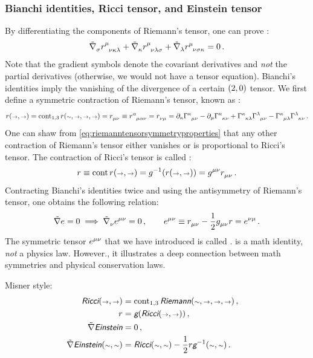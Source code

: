 \subsubsection{Bianchi identities, Ricci tensor, and Einstein tensor}
%
 By differentiating the components of Riemann's tensor, one can prove :
%
\begin{equation}\label{eq:bianchiidentities}
  \tgradcov\sigma\triemann\mu\nu\kappa\lambda 
  + \tgradcov\kappa\triemann\mu\nu\lambda\sigma 
  + \tgradcov\lambda\triemann\mu\nu\sigma\kappa
  = 0\,.
\end{equation}
%
 Note that the gradient symbols denote the covariant derivatives and \emph{not} the partial derivatives (otherwise, we would not have a tensor equation). Bianchi's identities imply the vanishing of the divergence of a certain $\torder 20$ tensor. We first define a symmetric contraction of Riemann's tensor, known as :
%
\begin{equation}\label{eq:riccitensordefinition}
  \ricci\vat{\vslot,\vslot} 
    = \cont_{1,3}\riemann\vat{\cslot,\vslot,\vslot,\vslot}
    = \tricci\mu\nu \defas \triemann\alpha\mu\alpha\nu
    = \tricci\nu\mu
    = \ipd\kappa\tchris\kappa\mu\nu - \ipd\mu\tchris\kappa\kappa\nu 
      + \tchris\kappa\kappa\lambda\tchris\lambda\mu\nu
      - \tchris\kappa\mu\lambda\tchris\lambda\kappa\nu\,.
\end{equation}
%
 One can shaw from \cref{eq:riemanntensorsymmetryproperties} that any other contraction of Riemann's tensor either vanishes or is proportional to Ricci's tensor. The contraction of Ricci's tensor is called :
%
\begin{equation}\label{eq:ricciscalardefinition}
  \sricci \defas \cont\ricci\vat{\vslot,\vslot}
    = \invmet\vat{\ricci\vat{\vslot,\vslot}}
    = \tinvmet\mu\nu\tricci\mu\nu\,.
\end{equation}
%
 Contracting Bianchi's identities twice and using the antisymmetry of Riemann's tensor, one obtains the following relation:
%
\begin{equation}\label{eq:einsteinstensordefinition}
  \gradcov\einstein = 0\implies
  \tgradcov\nu\teinstein\mu\nu = 0\,,\qquad
  \teinstein\mu\nu \defas \tricci\mu\nu - \dfrac 12\tmetric\mu\nu\sricci = \teinstein\nu\mu\,.
\end{equation}
%
The symmetric tensor $\teinstein\mu\nu$ that we have introduced is called .  is a math identity, \emph{not} a physics law. However., it illustrates a deep connection between math symmetries and physical conservation laws.

Misner style:
%
\begin{align*}
  \mricci\vat{\vslot,\vslot} &= \cont_{1,3}\mriemann\vat{\cslot,\vslot,\vslot,\vslot}\,,\quad \\
  \sricci &= \mmetric\vat{\mricci\vat{\vslot,\vslot}}\,,\quad \\
  \gradcov\meinstein &= 0\,,\\
  \gradcov\meinstein\vat{\cslot,\cslot} &= \mricci\vat{\cslot,\cslot}
    - \dfrac 12\sricci\minvmet\vat{\cslot,\cslot}\,.
\end{align*}
